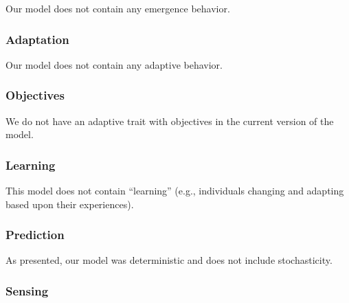 \documentclass{article}[12pt]
\begin{document}
Our model does not contain any emergence behavior.

\subsubsection{Adaptation}

Our model does not contain any adaptive behavior.

\subsubsection{Objectives}

We do not have an adaptive trait with objectives in the current version of the model.

\subsubsection{Learning}

This model does not contain ``learning'' (e.g., individuals changing and adapting based upon their experiences). 

\subsubsection{Prediction}

As presented, our model was deterministic and does not include stochasticity.


\subsubsection{Sensing}
\end{document}
